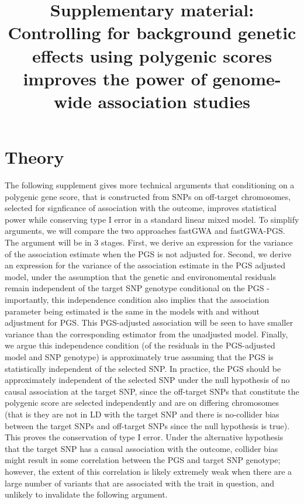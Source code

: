 \documentclass[10pt]{article}
\begin{document}
\title{Supplementary material: Controlling for background genetic effects using polygenic scores improves the power of genome-wide association studies}




\flushbottom
\maketitle
\doublespacing
\linenumbers
\section*{Theory}
The following supplement gives more technical arguments that conditioning on a polygenic gene score, that is constructed from SNPs on off-target chromosomes, selected for signficance of association with the outcome, improves statistical power while conserving type I error in a standard linear mixed model.  To simplify arguments, we will compare the two approaches fastGWA and fastGWA-PGS.  The argument will be in 3 stages.  First, we derive an expression for the variance of the association estimate when the PGS is not adjusted for.  Second, we derive an expression for the variance of the association estimate in the PGS adjusted model, under the assumption that the genetic and environomental residuals remain independent of the target SNP genotype conditional on the PGS - importantly, this independence condition also implies that the association parameter being estimated is the same in the models with and without adjustment for PGS.  This PGS-adjusted association will be seen to have smaller variance than the corresponding estimator from the unadjusted model.  Finally, we argue this independence condition (of the residuals in the PGS-adjusted model and SNP genotype) is approximately true assuming that the PGS is statistically independent of the selected SNP.   In practice, the PGS should be approximately independent of the selected SNP under the null hypothesis of no causal association at the target SNP, since the off-target SNPs that constitute the polygenic score are selected independently and are on differing chromosomes (that is they are not in LD with the target SNP and there is no-collider bias between the target SNPs and off-target SNPs since the null hypothesis is true).  This proves the conservation of type I error.  Under the alternative hypothesis that the target SNP has a causal association with the outcome, collider bias might result in some  correlation between the PGS and target SNP genotype; however, the extent of this correlation is likely extremely weak when there are a large number of variants that are associated with the trait in question, and unlikely to invalidate the following argument.
\end{document}
